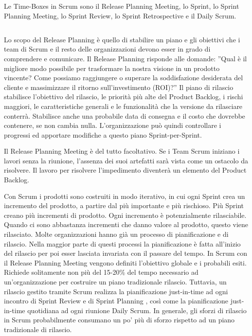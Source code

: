 \section*{\color{Blue}{TIME-BOXES}}
\label{sec:timeboxes}
Le Time-Boxes in Scrum sono il Release Planning Meeting, lo Sprint, lo Sprint Planning Meeting, lo Sprint Review, lo
Sprint Retrospective e il Daily Scrum.

\subsection*{\color{Blue}{RELEASE PLANNING MEETING}}
\label{sec:releaseplanningmeeting}
Lo scopo del Release Planning \`e quello di stabilire un piano e gli obiettivi che i team di Scrum e il resto delle
organizzazioni devono esser in grado di comprendere e comunicare. Il Release Planning  risponde alle domande: ''Qual \`e
il migliore modo possibile per trasformare la nostra visione in un prodotto vincente? Come possiamo raggiungere o superare la
soddisfazione desiderata del cliente e massimizzare il ritorno sull'investimento (ROI)?'' Il piano di rilascio stabilisce l'obiettivo
del rilascio, le priorit\`a pi\`u alte del Product Backlog, i rischi maggiori, le caratteristiche generali e le
funzionalit\`a che la versione da rilasciare conterr\`a. Stabilisce anche una probabile data di consegna e il costo che
dovrebbe contenere, se non cambia nulla. L'organizzazione pu\`o quindi controllare i progressi ed apportare modifiche a
questo piano Sprint-per-Sprint.
\newline

Il Release Planning Meeting \`e del tutto facoltativo. Se i Team Scrum iniziano i lavori senza la riunione,
l'assenza dei suoi artefatti sar\`a vista come un ostacolo da risolvere. Il lavoro per risolvere l'impedimento
diventer\`a un elemento del Product Backlog.
\newline

Con Scrum i prodotti sono costruiti in modo iterativo, in cui ogni Sprint crea un incremento del prodotto, a partire
dal pi\`u importante e pi\`u rischioso. Pi\`u Sprint creano pi\`u incrementi di prodotto. Ogni incremento \`e
potenzialmente rilasciabile. Quando ci sono abbastanza incrementi che danno valore al prodotto, questo viene
rilasciato. Molte organizzazioni hanno gi\`a un processo di pianificazione e di rilascio. Nella maggior parte di questi
processi la pianificazione \`e fatta all'inizio del rilascio per poi esser lasciata invariata con il passare del tempo.
In Scrum con il Release Planning Meeting vengono definiti l'obiettivo globale e i probabili esiti. Richiede solitamente non
pi\`u del 15-20\% del tempo necessario ad un'organizzazione per costruire un piano tradizionale rilascio. Tuttavia, un
rilascio gestito tramite Scrum realizza la pianificazione just-in-time ad ogni incontro di Sprint Review e di Sprint Planning ,
cos\`i come la pianificazione just-in-time quotidiana ad ogni riunione Daily Scrum. In generale, gli sforzi di rilascio
in Scrum probabilmente consumano un po' pi\`u di sforzo rispetto ad un piano tradizionale di rilascio.
\newline


